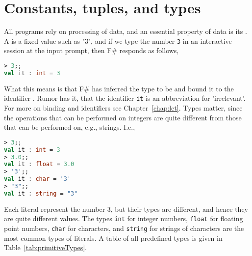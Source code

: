 \chapter{Constants, tuples, and types}
All programs rely on processing of data, and an essential property of data is its . A  is a fixed value such as "3", and if we type the number \lstinline!3! in an interactive session at the input prompt, then F\# responds as follows,
\begin{lstlisting}[language=fsharp,caption={fsharpi, typing the number 3.}]
> 3;;    
val it : int = 3
\end{lstlisting}
What this means is that F\# has inferred the type to be  and bound it to the identifier . Rumor has it, that the identifier \lstinline|it| is an abbreviation for 'irrelevant'. For more on binding and identifiers see Chapter~\ref{chap:let}. Types matter, since the operations that can be performed on integers are quite different from those that can be performed on, e.g., strings. I.e.,
%
\begin{lstlisting}[language=fsharp,caption={fsharpi, many representations of the number 3 but using different types.}]
> 3;;    
val it : int = 3
> 3.0;;
val it : float = 3.0
> '3';;
val it : char = '3'
> "3";;
val it : string = "3"
\end{lstlisting}
Each literal represent the number 3, but their types are different, and hence they are quite different values. The types \lstinline!int! for integer numbers, \lstinline!float! for floating point numbers, \lstinline!char! for characters, and \lstinline!string! for strings of characters are the most common types of literals. A table of all predefined types is given in Table~\ref{tab:primitiveTypes}.
